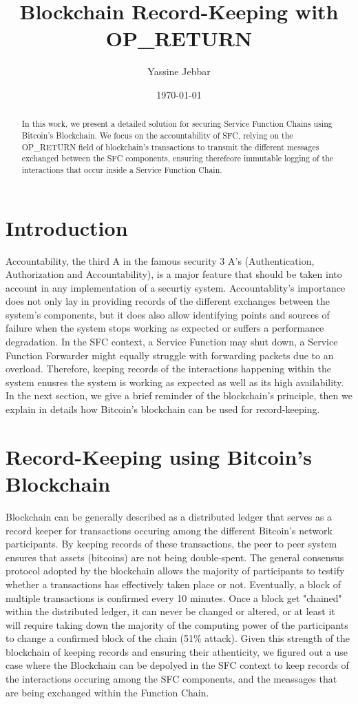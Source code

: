 \documentclass[a4paper]{article}
\title{Blockchain Record-Keeping with OP\_RETURN}
\author{Yassine Jebbar}
\date{\today}
\begin{document}
\maketitle

\begin{abstract}
In this work, we present a detailed solution for securing Service Function Chains using Bitcoin's Blockchain. We focus on the accountability of SFC, relying on the OP\_RETURN field of blockchain's transactions to transmit the different messages exchanged between the SFC components, ensuring therefeore immutable logging of the interactions that occur inside a Service Function Chain. 
\end{abstract}

\section{Introduction}
Accountability, the third A in the famous security 3 A's (Authentication, Authorization and Accountability), is a major feature that should be taken into account in any implementation of a securtiy system. Accountablity's importance does not only lay in providing records of the different exchanges between the system's components, but it does also allow identifying points and sources of failure when the system stops working as expected or suffers a performance degradation. In the SFC context, a Service Function may shut down, a Service Function Forwarder might equally struggle with forwarding packets due to an overload. Therefore, keeping records of the interactions happening within the system enusres the system is working as expected as well as its high availability. In the next section, we give a brief reminder of the blockchain's principle, then we explain in details how Bitcoin's blockchain can be used for record-keeping.
\section{Record-Keeping using Bitcoin's Blockchain}
Blockchain can be generally described as a distributed ledger that serves as a record keeper for transactions occuring among the different Bitcoin's network participants. By keeping records of these transactions, the peer to peer system ensures that assets (bitcoins) are not being double-spent. The general consensus protocol adopted by the blockchain allows the majority of participants to testify whether a transactions has effectively taken place or not. Eventually, a block of multiple transactions is confirmed every 10 minutes. Once a block get "chained" within the distributed ledger, it can never be changed or altered, or at least it will require taking down the majority of the computing power of the participants to change a confirmed block of the chain (51\% attack). Given this strength of the blockchain of keeping records and ensuring their athenticity, we figured out a use case where the Blockchain can be depolyed in the SFC context to keep records of the interactions occuring among the SFC components, and the meassages that are being exchanged within the Function Chain.
\end{document}
